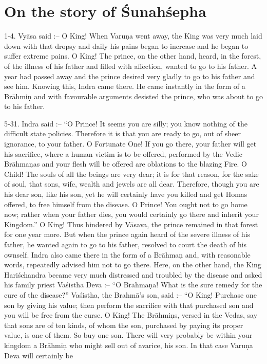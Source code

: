 \chapter{On the story of \'Sunah\'sepha}

1-4. Vy\=asa said :-- O King! When Varu\d{n}a went away, the King was very much laid down with that dropsy and daily his pains began to increase and he began to suffer extreme pains. O King! The prince, on the other hand, heard, in the forest, of the illness of his father and filled with affection, wanted to go to his father. A year had passed away and the prince desired very gladly to go to his father and see him. Knowing this, Indra came there. He came instantly in the form of a Br\=ahmi\d{n} and with favourable arguments desisted the prince, who was about to go to his father.

5-31. Indra said :-- ``O Prince! It seems you are silly; you know nothing of the difficult state policies. Therefore it is that you are ready to go, out of sheer ignorance, to your father. O Fortunate One! If you go there, your father will get his sacrifice, where a human victim is to be offered, performed by the Vedic Br\=ahma\d{n}as and your flesh will be offered are oblations to the blazing Fire. O Child! The souls of all the beings are very dear; it is for that reason, for the sake of soul, that sons, wife, wealth and jewels are all dear. Therefore, though you are his dear son, like his son, yet he will certainly have you killed and get Homas offered, to free himself from the disease. O Prince! You ought not to go home now; rather when your father dies, you would certainly go there and inherit your Kingdom.'' O King! Thus hindered by V\=asava, the prince remained in that forest for one year more. But when the prince again heard of the severe illness of his father, he wanted again to go to his father, resolved to court the death of his ownself. Indra also came there in the form of a Br\=ahma\d{n} and, with reasonable words, repeatedly advised him not to go there. Here, on the other hand, the King Hari\'schandra became very much distressed and troubled by the disease and asked his family priest Va\'sistha Deva :-- ``O Br\=ahma\d{n}a! What is the sure remedy for the cure of the disease?'' Va\'sistha, the Brahm\=a's son, said :-- ``O King! Purchase one son by giving his value; then perform the sacrifice with that purchased son and you will be free from the curse. O King! The Br\=ahmi\d{n}s, versed in the Vedas, say that sons are of ten kinds, of whom the son, purchased by paying its proper value, is one of them. So buy one son. There will very probably be within your kingdom a Br\=ahmi\d{n} who might sell out of avarice, his son. In that case Varu\d{n}a Deva will certainly be

